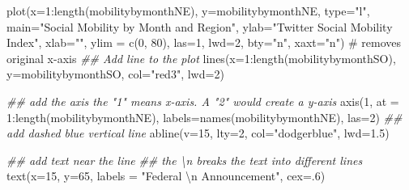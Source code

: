 \documentclass[
  letterpaper,
  DIV=11,
  numbers=noendperiod]{scrreprt}
\newenvironment{Shaded}{\begin{snugshade}}{\end{snugshade}}
\newcommand{\AttributeTok}[1]{\textcolor[rgb]{0.40,0.45,0.13}{#1}}
\newcommand{\CommentTok}[1]{\textcolor[rgb]{0.37,0.37,0.37}{#1}}
\newcommand{\DecValTok}[1]{\textcolor[rgb]{0.68,0.00,0.00}{#1}}
\newcommand{\DocumentationTok}[1]{\textcolor[rgb]{0.37,0.37,0.37}{\textit{#1}}}
\newcommand{\FloatTok}[1]{\textcolor[rgb]{0.68,0.00,0.00}{#1}}
\newcommand{\FunctionTok}[1]{\textcolor[rgb]{0.28,0.35,0.67}{#1}}
\newcommand{\NormalTok}[1]{\textcolor[rgb]{0.00,0.23,0.31}{#1}}
\newcommand{\SpecialCharTok}[1]{\textcolor[rgb]{0.37,0.37,0.37}{#1}}
\newcommand{\StringTok}[1]{\textcolor[rgb]{0.13,0.47,0.30}{#1}}
\begin{document}
\begin{Shaded}
\begin{Highlighting}[]
\FunctionTok{plot}\NormalTok{(}\AttributeTok{x=}\DecValTok{1}\SpecialCharTok{:}\FunctionTok{length}\NormalTok{(mobilitybymonthNE),}
     \AttributeTok{y=}\NormalTok{mobilitybymonthNE,}
     \AttributeTok{type=}\StringTok{"l"}\NormalTok{, }
     \AttributeTok{main=}\StringTok{"Social Mobility by Month and Region"}\NormalTok{,}
     \AttributeTok{ylab=}\StringTok{"Twitter Social Mobility Index"}\NormalTok{,}
     \AttributeTok{xlab=}\StringTok{""}\NormalTok{,}
     \AttributeTok{ylim =} \FunctionTok{c}\NormalTok{(}\DecValTok{0}\NormalTok{, }\DecValTok{80}\NormalTok{),}
     \AttributeTok{las=}\DecValTok{1}\NormalTok{, }
     \AttributeTok{lwd=}\DecValTok{2}\NormalTok{, }
     \AttributeTok{bty=}\StringTok{"n"}\NormalTok{,}
     \AttributeTok{xaxt=}\StringTok{"n"}\NormalTok{) }\CommentTok{\# removes original x{-}axis}
\DocumentationTok{\#\# Add line to the plot }
\FunctionTok{lines}\NormalTok{(}\AttributeTok{x=}\DecValTok{1}\SpecialCharTok{:}\FunctionTok{length}\NormalTok{(mobilitybymonthSO),}
     \AttributeTok{y=}\NormalTok{mobilitybymonthSO, }\AttributeTok{col=}\StringTok{"red3"}\NormalTok{, }\AttributeTok{lwd=}\DecValTok{2}\NormalTok{)}

\DocumentationTok{\#\# add the axis the "1" means x{-}axis. A "2" would create a y{-}axis}
\FunctionTok{axis}\NormalTok{(}\DecValTok{1}\NormalTok{, }\AttributeTok{at =} \DecValTok{1}\SpecialCharTok{:}\FunctionTok{length}\NormalTok{(mobilitybymonthNE), }
     \AttributeTok{labels=}\FunctionTok{names}\NormalTok{(mobilitybymonthNE), }\AttributeTok{las=}\DecValTok{2}\NormalTok{)}
\DocumentationTok{\#\# add dashed blue vertical line}
\FunctionTok{abline}\NormalTok{(}\AttributeTok{v=}\DecValTok{15}\NormalTok{, }\AttributeTok{lty=}\DecValTok{2}\NormalTok{, }\AttributeTok{col=}\StringTok{"dodgerblue"}\NormalTok{, }\AttributeTok{lwd=}\FloatTok{1.5}\NormalTok{)}

\DocumentationTok{\#\# add text near the line}
\DocumentationTok{\#\# the \textbackslash{}n breaks the text into different lines}
\FunctionTok{text}\NormalTok{(}\AttributeTok{x=}\DecValTok{15}\NormalTok{, }\AttributeTok{y=}\DecValTok{65}\NormalTok{, }\AttributeTok{labels =} \StringTok{"Federal }\SpecialCharTok{\textbackslash{}n}\StringTok{ Announcement"}\NormalTok{, }\AttributeTok{cex=}\NormalTok{.}\DecValTok{6}\NormalTok{)}
\end{Highlighting}
\end{Shaded}
\end{document}
